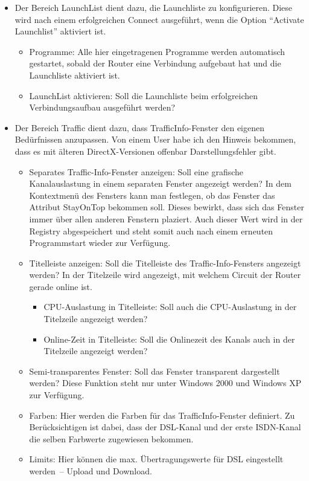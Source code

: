 \begin{itemize}
  \item Der Bereich LaunchList dient dazu, die Launchliste zu konfigurieren. 
    Diese wird nach einem erfolgreichen Connect ausgeführt, wenn die Option 
    ``Activate Launchlist'' aktiviert ist.
    \begin{itemize}
      \item Programme: Alle hier eingetragenen Programme werden automatisch 
        gestartet, sobald der Router eine Verbindung aufgebaut hat und die
        Launchliste aktiviert ist.
      \item LaunchList aktivieren: Soll die Launchliste beim erfolgreichen
        Verbindungsaufbau ausgeführt werden?
    \end{itemize}

  \item Der Bereich Traffic dient dazu, dass TrafficInfo-Fenster den eigenen 
    Bedürfnissen anzupassen. Von einem User habe ich den Hinweis bekommen, dass 
    es mit älteren DirectX-Versionen offenbar Darstellungsfehler gibt.
    \begin{itemize}
      \item Separates Traffic-Info-Fenster anzeigen: Soll eine grafische 
        Kanalauslastung in einem separaten Fenster angezeigt werden? In dem 
        Kontextmenü des Fensters kann man festlegen, ob das Fenster das 
        Attribut StayOnTop bekommen soll. Dieses bewirkt, dass sich das Fenster 
        immer über allen anderen Fenstern plaziert. Auch dieser Wert wird in der 
        Registry abgespeichert und steht somit auch nach einem erneuten 
        Programmstart wieder zur Verfügung.
      \item Titelleiste anzeigen: Soll die Titelleiste des Traffic-Info-Fensters 
        angezeigt werden? In der Titelzeile wird angezeigt, mit welchem Circuit 
        der Router gerade online ist.
        \begin{itemize}
          \item CPU-Auslastung in Titelleiste: Soll auch die CPU-Auslastung in
            der Titelzeile angezeigt werden?
          \item Online-Zeit in Titelleiste: Soll die Onlinezeit des Kanals auch 
            in der Titelzeile angezeigt werden?
        \end{itemize}
      \item Semi-transparentes Fenster: Soll das Fenster transparent dargestellt 
        werden? Diese Funktion steht nur unter Windows 2000 und Windows XP zur 
        Verfügung.
      \item Farben: Hier werden die Farben für das TrafficInfo-Fenster 
        definiert. Zu Berücksichtigen ist dabei, dass der DSL-Kanal und der 
        erste ISDN-Kanal die selben Farbwerte zugewiesen bekommen.
      \item Limits: Hier können die max. Übertragungswerte für DSL eingestellt 
        werden~-- Upload und Download.
    \end{itemize}


\end{itemize}
